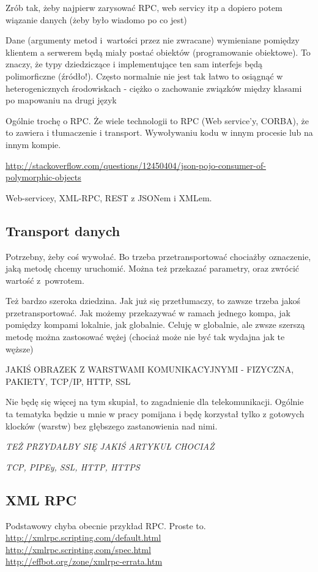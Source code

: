 Zrób tak, żeby najpierw zarysować RPC, web servicy itp a dopiero potem wiązanie danych (żeby było wiadomo po co jest)

Dane (argumenty metod i~wartości przez nie zwracane) wymieniane pomiędzy klientem a serwerem będą miały postać obiektów (programowanie obiektowe). To znaczy, że typy dziedziczące i implementujące ten sam interfejs będą polimorficzne (źródło!). Często normalnie nie jest tak łatwo to osiągnąć w heterogenicznych środowiskach - ciężko o zachowanie związków między klasami po mapowaniu na drugi język

Ogólnie trochę o RPC. Że wiele technologii to RPC (Web service'y, CORBA), że to zawiera i tłumaczenie i transport.
Wywoływaniu kodu w innym procesie lub na innym kompie.

\url{http://stackoverflow.com/questions/12450404/json-pojo-consumer-of-polymorphic-objects}

Web-servicey, XML-RPC, REST z JSONem i XMLem. 

\subsection{Transport danych}
Potrzebny, żeby coś wywołać. Bo trzeba przetransportować chociażby oznaczenie, jaką metodę chcemy uruchomić. Można też przekazać parametry, oraz zwrócić wartość z~powrotem.

Też bardzo szeroka dziedzina. Jak już się przetłumaczy, to zawsze trzeba jakoś przetransportować. Jak możemy przekazywać w ramach jednego kompa, jak pomiędzy kompami lokalnie, jak globalnie.
Celuję w globalnie, ale zwsze szerszą metodę można zastosować wężej (chociaż może nie być tak wydajna jak te węższe)

JAKIŚ OBRAZEK Z WARSTWAMI KOMUNIKACYJNYMI - FIZYCZNA, PAKIETY, TCP/IP, HTTP, SSL

Nie będę się więcej na tym skupiał, to zagadnienie dla telekomunikacji. Ogólnie ta tematyka będzie u mnie w pracy pomijana i będę korzystał tylko z gotowych klocków (warstw) bez głębszego zastanowienia nad nimi. 

\emph{TEŻ PRZYDAŁBY SIĘ JAKIŚ ARTYKUŁ CHOCIAŻ}

\emph{TCP, PIPEy, SSL, HTTP, HTTPS}

\subsection{XML RPC}
Podstawowy chyba obecnie przykład RPC. Proste to.
\url{http://xmlrpc.scripting.com/default.html}\\
\url{http://xmlrpc.scripting.com/spec.html}\\
\url{http://effbot.org/zone/xmlrpc-errata.htm}\\

